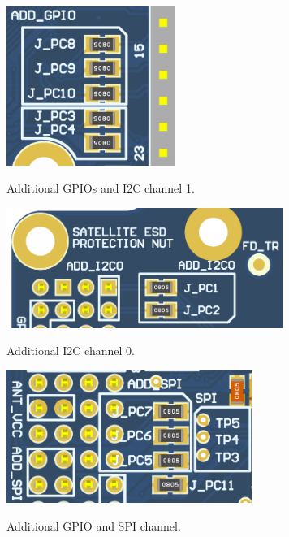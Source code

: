\begin{figure}[!ht]
    \begin{center}
         \includegraphics[width=55mm]{figures/add_gpio_i2c1_jumpers.png}
        \caption{Additional GPIOs and I2C channel 1.}
        \label{fig:add_gpio_i2c1_jumpers}
        \includegraphics[width=90mm]{figures/add_i2c0_jumpers.png}
        \caption{Additional I2C channel 0.}
        \label{fig:add_i2c0_jumpers}
        \includegraphics[width=80mm]{figures/add_spi_1gpio_jumpers.png}
        \caption{Additional GPIO and SPI channel.}
        \label{fig:add_spi_1gpio_jumpers}
    \end{center}
\end{figure}
